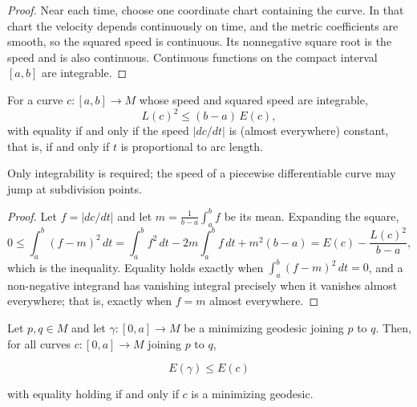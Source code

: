 \begin{proof}
  \leanok
  \sketch
  Near each time, choose one coordinate chart containing the curve. In that
  chart the velocity depends continuously on time, and the metric coefficients
  are smooth, so the squared speed is continuous. Its nonnegative square root
  is the speed and is also continuous. Continuous functions on the compact
  interval $[a,b]$ are integrable.
\end{proof}
\begin{lemma}
  \label{lem:dc-ch9-2-2-schwarz}
  \leanok
  For a curve $c:[a,b]\to M$ whose speed and squared speed are integrable,
  $$
  L(c)^2\le (b-a)\,E(c),
  $$
  with equality if and only if the speed $|dc/dt|$ is (almost everywhere) constant, that
  is, if and only if $t$ is proportional to arc length.

  Only integrability is required; the speed of a piecewise differentiable curve
  may jump at subdivision points.
\end{lemma}
\begin{proof}
  \leanok
  \sketch
  Let $f=|dc/dt|$ and let $m=\frac{1}{b-a}\int_a^b f$ be its mean. Expanding the square,
  $$
  0\le\int_a^b (f-m)^2\,dt=\int_a^b f^2\,dt-2m\int_a^b f\,dt+m^2(b-a)=E(c)-\frac{L(c)^2}{b-a},
  $$
  which is the inequality. Equality holds exactly when $\int_a^b(f-m)^2\,dt=0$, and a
  non-negative integrand has vanishing integral precisely when it vanishes almost
  everywhere; that is, exactly when $f=m$ almost everywhere.
\end{proof}
\begin{lemma}
  \label{lem:dc-ch9-2-3}
  \leanok
  Let $p,q\in M$ and let $\gamma:[0,a]\to M$ be a minimizing geodesic joining $p$ to
  $q$. Then, for all curves $c:[0,a]\to M$ joining $p$ to $q$,

  $$
  E(\gamma)\le E(c)
  $$

  with equality holding if and only if $c$ is a minimizing geodesic.
\end{lemma}
